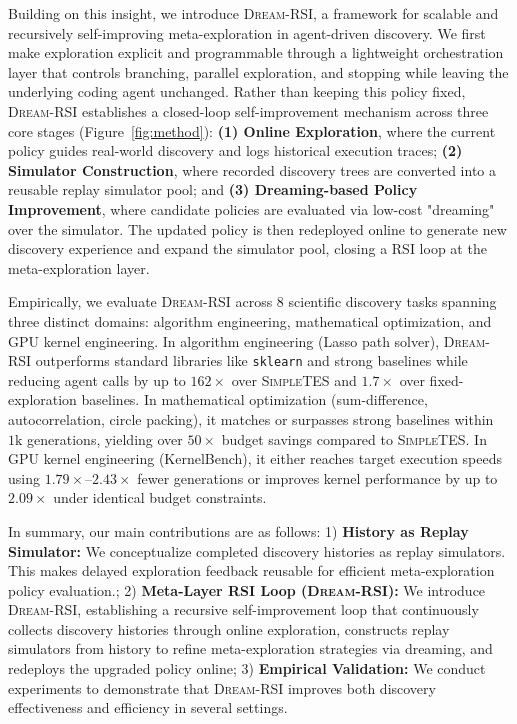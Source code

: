 Building on this insight, we introduce \textsc{Dream-RSI}, a framework for scalable and recursively self-improving meta-exploration in agent-driven discovery. We first make exploration explicit and programmable through a lightweight orchestration layer that controls branching, parallel exploration, and stopping while leaving the underlying coding agent unchanged. Rather than keeping this policy fixed, \textsc{Dream-RSI} establishes a closed-loop self-improvement mechanism across three core stages (Figure~\ref{fig:method}): \textbf{(1) Online Exploration}, where the current policy guides real-world discovery and logs historical execution traces; \textbf{(2) Simulator Construction}, where recorded discovery trees are converted into a reusable replay simulator pool; and \textbf{(3) Dreaming-based Policy Improvement}, where candidate policies are evaluated via low-cost "dreaming" over the simulator. The updated policy is then redeployed online to generate new discovery experience and expand the simulator pool, closing a RSI loop at the meta-exploration layer.

Empirically, we evaluate \textsc{Dream-RSI} across 8 scientific discovery tasks spanning three distinct domains: algorithm engineering, mathematical optimization, and GPU kernel engineering. In algorithm engineering (Lasso path solver), \textsc{Dream-RSI} outperforms standard libraries like \texttt{sklearn} and strong baselines while reducing agent calls by up to $162\times$ over \textsc{SimpleTES} and $1.7\times$ over fixed-exploration baselines. In mathematical optimization (sum-difference, autocorrelation, circle packing), it matches or surpasses strong baselines within $1\text{k}$ generations, yielding over $50\times$ budget savings compared to \textsc{SimpleTES}. In GPU kernel engineering (KernelBench), it either reaches target execution speeds using $1.79\times$--$2.43\times$ fewer generations or improves kernel performance by up to $2.09\times$ under identical budget constraints.  

In summary, our main contributions are as follows: 1) \textbf{History as Replay Simulator:} We conceptualize completed discovery histories as replay simulators. This makes delayed exploration feedback reusable for efficient meta-exploration policy evaluation.;   2) \textbf{Meta-Layer RSI Loop (\textsc{Dream-RSI}):} We introduce \textsc{Dream-RSI}, establishing a recursive self-improvement loop that continuously collects discovery histories through online exploration, constructs replay simulators from history to refine meta-exploration strategies via  dreaming, and redeploys the upgraded policy online; 3) \textbf{Empirical Validation:} We conduct experiments to demonstrate that \textsc{Dream-RSI} improves both discovery effectiveness and efficiency in several settings.

